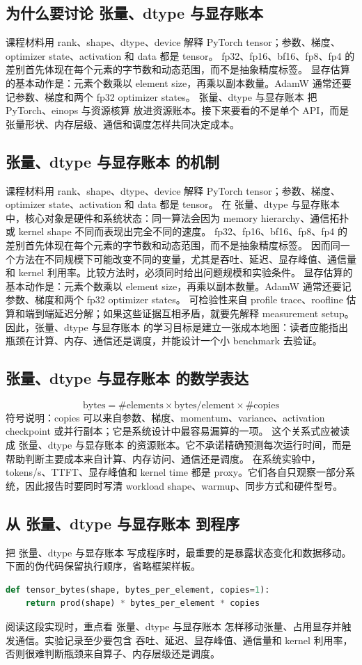 \documentclass[a4paper]{article}
\begin{document}
\subsection{为什么要讨论 张量、dtype 与显存账本}
课程材料用 rank、shape、dtype、device 解释 PyTorch tensor；参数、梯度、optimizer state、activation 和 data 都是 tensor。
fp32、fp16、bf16、fp8、fp4 的差别首先体现在每个元素的字节数和动态范围，而不是抽象精度标签。
显存估算的基本动作是：元素个数乘以 element size，再乘以副本数量。AdamW 通常还要记参数、梯度和两个 fp32 optimizer states。
张量、dtype 与显存账本 把 PyTorch、einops 与资源核算 放进资源账本。接下来要看的不是单个 API，而是张量形状、内存层级、通信和调度怎样共同决定成本。
\subsection{张量、dtype 与显存账本 的机制}
课程材料用 rank、shape、dtype、device 解释 PyTorch tensor；参数、梯度、optimizer state、activation 和 data 都是 tensor。 在 张量、dtype 与显存账本 中，核心对象是硬件和系统状态：同一算法会因为 memory hierarchy、通信拓扑或 kernel shape 不同而表现出完全不同的速度。
fp32、fp16、bf16、fp8、fp4 的差别首先体现在每个元素的字节数和动态范围，而不是抽象精度标签。 因而同一个方法在不同规模下可能改变不同的变量，尤其是吞吐、延迟、显存峰值、通信量和 kernel 利用率。比较方法时，必须同时给出问题规模和实验条件。
显存估算的基本动作是：元素个数乘以 element size，再乘以副本数量。AdamW 通常还要记参数、梯度和两个 fp32 optimizer states。 可检验性来自 profile trace、roofline 估算和端到端延迟分解；如果这些证据互相矛盾，就要先解释 measurement setup。
因此，张量、dtype 与显存账本 的学习目标是建立一张成本地图：读者应能指出瓶颈在计算、内存、通信还是调度，并能设计一个小 benchmark 去验证。
\subsection{张量、dtype 与显存账本 的数学表达}
\[\text{bytes}=\#\text{elements}\times\text{bytes/element}\times\#\text{copies}\]
符号说明：copies 可以来自参数、梯度、momentum、variance、activation checkpoint 或并行副本；它是系统设计中最容易漏算的一项。
这个关系式应被读成 张量、dtype 与显存账本 的资源账本。它不承诺精确预测每次运行时间，而是帮助判断主要成本来自计算、内存访问、通信还是调度。
在系统实验中，tokens/s、TTFT、显存峰值和 kernel time 都是 proxy。它们各自只观察一部分系统，因此报告时要同时写清 workload shape、warmup、同步方式和硬件型号。
\subsection{从 张量、dtype 与显存账本 到程序}
把 张量、dtype 与显存账本 写成程序时，最重要的是暴露状态变化和数据移动。下面的伪代码保留执行顺序，省略框架样板。
\begin{lstlisting}[language=Python]
def tensor_bytes(shape, bytes_per_element, copies=1):
    return prod(shape) * bytes_per_element * copies
\end{lstlisting}
阅读这段实现时，重点看 张量、dtype 与显存账本 怎样移动张量、占用显存并触发通信。实验记录至少要包含 吞吐、延迟、显存峰值、通信量和 kernel 利用率，否则很难判断瓶颈来自算子、内存层级还是调度。
\end{document}
